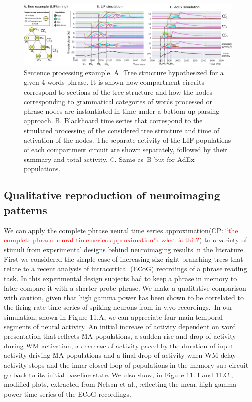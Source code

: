 \documentclass[10pt]{article}
\newcommand{\noteCP}[1]{(CP: \textcolor{red}{#1})}
\begin{document}
\begin{figure}[h!]
  \begin{center}
    \includegraphics[width=1.00\columnwidth]{figures/compartments_tree_example/compartments_tree_example}
    \caption{Sentence processing example.
      A. Tree structure hypothesized for a given 4 words phrase.
      It is shown how compartment circuits correspond to sections of the tree structure and how the nodes corresponding to grammatical categories of words processed or phrase nodes are instantiated in time under a bottom-up parsing approach.
      B. Blackboard time series that correspond to the simulated processing of the considered tree structure and time of activation of the nodes.
      The separate activity of the LIF populations of each compartment circuit are shown separately, followed by their summary and total activity.
      C. Same as~B but for AdEx populations. {\label{679921}}%
    }
  \end{center}
\end{figure}


\subsection{Qualitative reproduction of neuroimaging patterns}

{\label{444332747980}}

We can apply the complete phrase neural time series approximation\noteCP{``the complete phrase neural time series approximation'': what is this?} to a variety of stimuli from experimental designs behind neuroimaging results in the literature.
First we considered the simple case of increasing size right branching trees that relate to a recent analysis of intracortical (ECoG) recordings of a phrase reading task\cite{Nelson_2017}.
In this experimental design subjects had to keep a phrase in memory to later compare it with a shorter probe phrase.
We make a qualitative comparison with caution, given that high gamma power has been shown to be correlated to the firing rate time series of spiking neurons from in-vivo recordings\cite{Ray_2011}.~In our simulation, shown in Figure 11.A, we can appreciate four main temporal segments of neural activity.
An initial increase of activity dependent on word presentation that reflects MA populations, a sudden rise and drop of activity during WM activation, a decrease of activity paced by the duration of input activity driving MA populations and a final drop of activity when WM delay activity stops and the inner closed loop of populations in the memory sub-circuit go back to its initial baseline state.
We also show, in Figure 11.B and 11.C., modified plots, extracted from Nelson et al., reflecting the mean high gamma power time series of the ECoG recordings.
\end{document}
